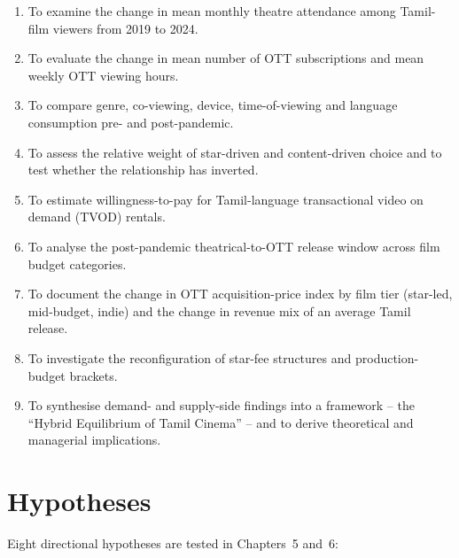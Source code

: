 \begin{enumerate}[itemsep=2pt]
  \item To examine the change in mean monthly theatre attendance
        among Tamil-film viewers from 2019 to 2024.
  \item To evaluate the change in mean number of OTT subscriptions
        and mean weekly OTT viewing hours.
  \item To compare genre, co-viewing, device, time-of-viewing and
        language consumption pre- and post-pandemic.
  \item To assess the relative weight of star-driven and
        content-driven choice and to test whether the relationship
        has inverted.
  \item To estimate willingness-to-pay for Tamil-language
        transactional video on demand (TVOD) rentals.
  \item To analyse the post-pandemic theatrical-to-OTT release
        window across film budget categories.
  \item To document the change in OTT acquisition-price index by
        film tier (star-led, mid-budget, indie) and the change in
        revenue mix of an average Tamil release.
  \item To investigate the reconfiguration of star-fee structures
        and production-budget brackets.
  \item To synthesise demand- and supply-side findings into a
        framework -- the ``Hybrid Equilibrium of Tamil Cinema'' --
        and to derive theoretical and managerial implications.
\end{enumerate}

\section{Hypotheses}
\label{sec:hypotheses}

Eight directional hypotheses are tested in Chapters~5 and~6:

